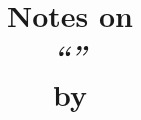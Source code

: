 \documentclass[12pt,b5paper]{article}
\title{{\Large Notes on}
\\ \emph{``\termUntitledDocument''}
\\ {\Large by \exampleNameSC}}
\author{\exampleNameSC}
\begin{document}

\maketitle
\tableofcontents


\section{\termIntroduction}
\label{section:01.00}





\end{document}
